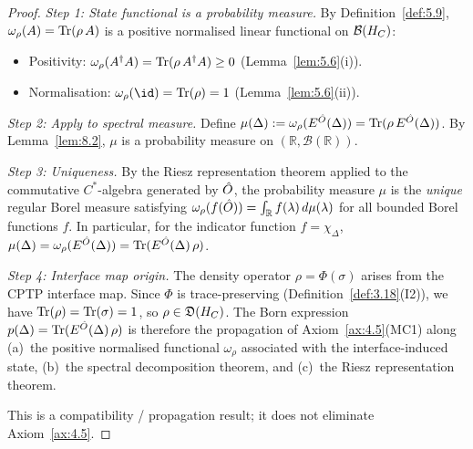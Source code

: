 \begin{proof}
\textit{Step 1: State functional is a probability measure.}
By Definition~\ref{def:5.9}, $\omega_\rho(A) = \mathrm{Tr}(\rho\,A)$ is a
positive normalised linear functional on $\mathcal{B}(H_C)$:
\begin{itemize}
  \item Positivity: $\omega_\rho(A^\dagger A) = \mathrm{Tr}(\rho\,A^\dagger A)
    \geq 0$ (Lemma~\ref{lem:5.6}(i)).
  \item Normalisation: $\omega_\rho(\id) = \Tr(\rho) = 1$
    (Lemma~\ref{lem:5.6}(ii)).
\end{itemize}

\textit{Step 2: Apply to spectral measure.}
Define $\mu(\Delta) := \omega_\rho(E^{\hat{O}}(\Delta))
= \mathrm{Tr}(\rho\,E^{\hat{O}}(\Delta))$.  By Lemma~\ref{lem:8.2},
$\mu$ is a probability measure on $(\mathbb{R},
\mathcal{B}(\mathbb{R}))$.

\textit{Step 3: Uniqueness.}
By the Riesz representation theorem applied to the commutative
$C^*$-algebra generated by $\hat{O}$, the probability measure $\mu$ is
the \emph{unique} regular Borel measure satisfying
$\omega_\rho(f(\hat{O})) = \int_\mathbb{R} f(\lambda)\,d\mu(\lambda)$
for all bounded Borel functions $f$.  In particular, for the indicator
function $f = \chi_\Delta$, $\mu(\Delta) = \omega_\rho(E^{\hat{O}}(\Delta))
= \mathrm{Tr}(E^{\hat{O}}(\Delta)\,\rho)$.

\textit{Step 4: Interface map origin.}
The density operator $\rho = \Phi(\sigma)$ arises from the CPTP
interface map.  Since $\Phi$ is trace-preserving
(Definition~\ref{def:3.18}(I2)), we have $\mathrm{Tr}(\rho) = \mathrm{Tr}(\sigma) = 1$,
so $\rho \in \mathfrak{D}(H_C)$.  The Born expression
$p(\Delta) = \mathrm{Tr}(E^{\hat{O}}(\Delta)\,\rho)$ is therefore the
propagation of Axiom~\ref{ax:4.5}(MC1) along
(a)~the positive normalised functional $\omega_\rho$ associated with
the interface-induced state, (b)~the spectral decomposition theorem,
and (c)~the Riesz representation theorem.

This is a compatibility / propagation result; it does not eliminate
Axiom~\ref{ax:4.5}.
\end{proof}

